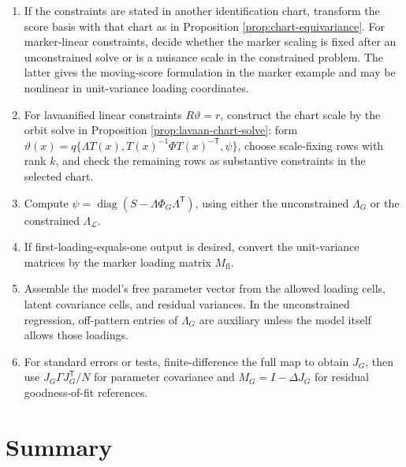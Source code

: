 \documentclass[11pt]{article}
\newcommand{\T}{^{\mathsf T}}
\newcommand{\diag}{\operatorname{diag}}
\theoremstyle{plain}
\theoremstyle{remark}
\begin{document}
\begin{enumerate}
  \texttt{fit\_noniterative\_cfa\_metric} path implements the closed-form
  multi-group metric version for simple-structure CFA: for each factor it forms
  the standardized-score cross-covariance matrix across groups and takes its
  best rank-one approximation. This estimates a common loading shape and
  group-specific scales before converting to the output marker chart, so the
  fitted common covariance is invariant to which nonzero indicator is chosen as
  marker.
\item If the constraints are stated in another identification chart, transform
  the score basis with that chart as in Proposition
  \ref{prop:chart-equivariance}. For marker-linear constraints, decide whether
  the marker scaling is fixed after an unconstrained solve or is a nuisance
  scale in the constrained problem. The latter gives the moving-score
  formulation in the marker example and may be nonlinear in unit-variance
  loading coordinates.
\item For lavaanified linear constraints \(R\vartheta=r\), construct the chart
  scale by the orbit solve in Proposition \ref{prop:lavaan-chart-solve}: form
  \(\vartheta(x)=q\{\Lambda T(x),T(x)^{-1}\Phi T(x)^{-\mathsf T},\psi\}\),
  choose scale-fixing rows with rank \(k\), and check the remaining rows as
  substantive constraints in the selected chart.
\item Compute \(\psi=\diag(S-\Lambda\Phi_G\Lambda\T)\), using either the
  unconstrained \(\Lambda_G\) or the constrained
  \(\Lambda_{\mathcal L}\).
\item If first-loading-equals-one output is desired, convert the
  unit-variance matrices by the marker loading matrix \(M_{\mathrm{fl}}\).
\item Assemble the model's free parameter vector from the allowed loading cells,
  latent covariance cells, and residual variances. In the unconstrained
  regression, off-pattern entries of \(\Lambda_G\) are auxiliary unless the
  model itself allows those loadings.
\item For standard errors or tests, finite-difference the full map to obtain
  \(J_G\), then use \(J_G\Gamma J_G\T/N\) for parameter covariance and
  \(M_G=I-\Delta J_G\) for residual goodness-of-fit references.
\end{enumerate}

\section*{Summary}
\end{document}
